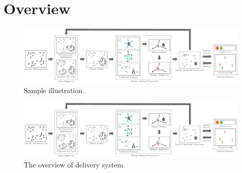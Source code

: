 \section{Overview}

\ifx
\begin{figure}[htb]
\centering
\includegraphics{images/Pipeline.eps}
\caption{Sample illustration.}
\end{figure}
\else
\begin{figure}[htbp]
\centering
  \includegraphics[width=1\linewidth]{images/Pipeline.eps}%
  \caption{The overview of delivery system.}\label{fig.2}
  \end{figure}
  \fi